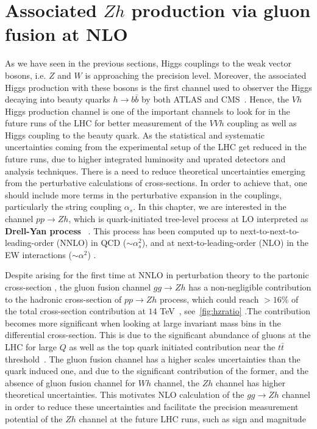 \chapter{ Associated $Zh$ production via gluon fusion at NLO }\label{chap:hz}
\par As we have seen in the previous sections, Higgs couplings to the weak vector bosons, i.e. $Z$ and $W$ is approaching the precision level. Moreover, the associated Higgs production with these bosons is the first channel used to observer the Higgs decaying into beauty quarks   $h \rightarrow b \bar{b}$ by both ATLAS and CMS~\cite{Aaboud:2018zhk, Sirunyan:2018kst}. Hence, the $ Vh$ Higgs production channel is one of the important channels to look for in the future runs of the LHC for better measurement of the $VVh$ coupling as well as Higgs coupling to the beauty quark. As the statistical and systematic uncertainties coming from the experimental setup of the LHC get reduced in the future runs, due to higher integrated luminosity and uprated detectors and analysis techniques. There is a  need to reduce theoretical uncertainties emerging from the perturbative calculations of  cross-sections. In order to achieve that, one should include more terms in the perturbative expansion in the couplings, particularly the string coupling $\alpha_s$. In this chapter, we are interested in the channel $pp\to Zh$, which is quark-initiated tree-level process at LO interpreted as \textbf{Drell-Yan process}~ \cite{Han:1991ia,Brein:2003wg}. This process has been computed up to next-to-next-to-leading-order (NNLO) in QCD ($\sim \alpha_s^2$), and
at next-to-leading-order (NLO) in the EW interactions ($\sim \alpha^2 $) \cite{Amoroso:2020lgh}.
\par Despite arising for the first time at NNLO in perturbation theory to the partonic cross-section  , the gluon fusion channel $g g \rightarrow Zh$ has a non-negligible contribution to the hadronic cross-section of  $pp\to Zh$ process, which could reach $>16\%$ of the total cross-section contribution at $14$ TeV~\cite{Cepeda:2019klc}, see~\autoref{fig:hzratio} .The contribution becomes more significant when looking at large invariant mass bins in the differential cross-section. This is due to the significant abundance of gluons at the LHC for large $Q$ as well as the top quark initiated contribution near the $t\bar t$ threshold~\cite{Englert:2013vua}.  The gluon fusion channel has a higher scales uncertainties than the quark induced one, and due to the significant contribution of the former, and the absence of gluon fusion channel for $Wh$ channel, the $Zh$ channel has  higher theoretical uncertainties. This motivates NLO calculation of the  $g g \rightarrow Z h$ channel in order to reduce these uncertainties and facilitate the precision measurement potential of the $Zh$ channel at the future LHC runs, such as sign and magnitude
